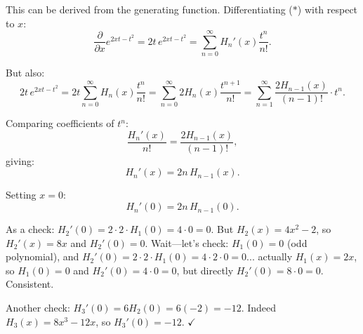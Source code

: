\documentclass[12pt]{article}
\begin{document}
This can be derived from the generating function. Differentiating ($*$) with respect to $x$:
\[
\frac{\partial}{\partial x}e^{2xt-t^2} = 2t\,e^{2xt-t^2} = \sum_{n=0}^{\infty}H_n'(x)\frac{t^n}{n!}.
\]

But also:
\[
2t\,e^{2xt-t^2} = 2t\sum_{n=0}^{\infty}H_n(x)\frac{t^n}{n!} = \sum_{n=0}^{\infty}2H_n(x)\frac{t^{n+1}}{n!} = \sum_{n=1}^{\infty}\frac{2H_{n-1}(x)}{(n-1)!}\cdot t^n.
\]

Comparing coefficients of $t^n$:
\[
\frac{H_n'(x)}{n!} = \frac{2H_{n-1}(x)}{(n-1)!},
\]
giving:
\[
H_n'(x) = 2n\,H_{n-1}(x).
\]

Setting $x = 0$:
\[
\boxed{H_n'(0) = 2n\,H_{n-1}(0).}
\]

As a check: $H_2'(0) = 2\cdot 2\cdot H_1(0) = 4\cdot 0 = 0$. But $H_2(x) = 4x^2-2$, so $H_2'(x) = 8x$ and $H_2'(0) = 0$. Wait---let's check: $H_1(0) = 0$ (odd polynomial), and $H_2'(0) = 2\cdot 2 \cdot H_1(0) = 4\cdot 2\cdot 0 = 0$... actually $H_1(x) = 2x$, so $H_1(0) = 0$ and $H_2'(0) = 4\cdot 0 = 0$, but directly $H_2'(0) = 8\cdot 0 = 0$. Consistent.

Another check: $H_3'(0) = 6 H_2(0) = 6(-2) = -12$. Indeed $H_3(x) = 8x^3 - 12x$, so $H_3'(0) = -12$. $\checkmark$
\end{document}
